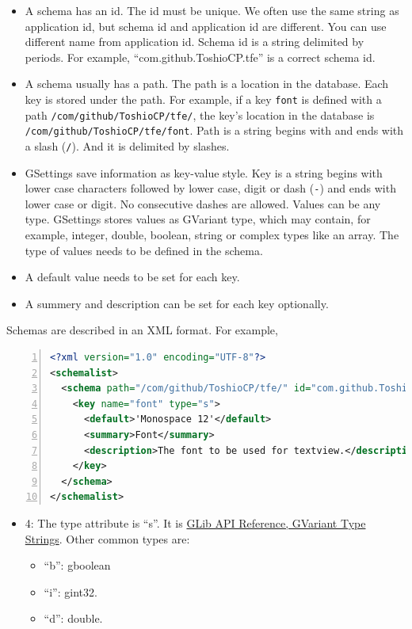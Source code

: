 \begin{itemize}
\tightlist
\item
  A schema has an id. The id must be unique. We often use the same
  string as application id, but schema id and application id are
  different. You can use different name from application id. Schema id
  is a string delimited by periods. For example,
  ``com.github.ToshioCP.tfe'' is a correct schema id.
\item
  A schema usually has a path. The path is a location in the database.
  Each key is stored under the path. For example, if a key
  \passthrough{\lstinline!font!} is defined with a path
  \passthrough{\lstinline!/com/github/ToshioCP/tfe/!}, the key's
  location in the database is
  \passthrough{\lstinline!/com/github/ToshioCP/tfe/font!}. Path is a
  string begins with and ends with a slash
  (\passthrough{\lstinline!/!}). And it is delimited by slashes.
\item
  GSettings save information as key-value style. Key is a string begins
  with lower case characters followed by lower case, digit or dash
  (\passthrough{\lstinline!-!}) and ends with lower case or digit. No
  consecutive dashes are allowed. Values can be any type. GSettings
  stores values as GVariant type, which may contain, for example,
  integer, double, boolean, string or complex types like an array. The
  type of values needs to be defined in the schema.
\item
  A default value needs to be set for each key.
\item
  A summery and description can be set for each key optionally.
\end{itemize}

Schemas are described in an XML format. For example,

\begin{lstlisting}[language=XML, numbers=left]
<?xml version="1.0" encoding="UTF-8"?>
<schemalist>
  <schema path="/com/github/ToshioCP/tfe/" id="com.github.ToshioCP.tfe">
    <key name="font" type="s">
      <default>'Monospace 12'</default>
      <summary>Font</summary>
      <description>The font to be used for textview.</description>
    </key>
  </schema>
</schemalist>
\end{lstlisting}

\begin{itemize}
\tightlist
\item
  4: The type attribute is ``s''. It is
  \href{https://docs.gtk.org/glib/struct.VariantType.html\#gvariant-type-strings}{GLib
  API Reference, GVariant Type Strings}. Other common types are:

  \begin{itemize}
  \tightlist
  \item
    ``b'': gboolean
  \item
    ``i'': gint32.
  \item
    ``d'': double.
  \end{itemize}
\end{itemize}

